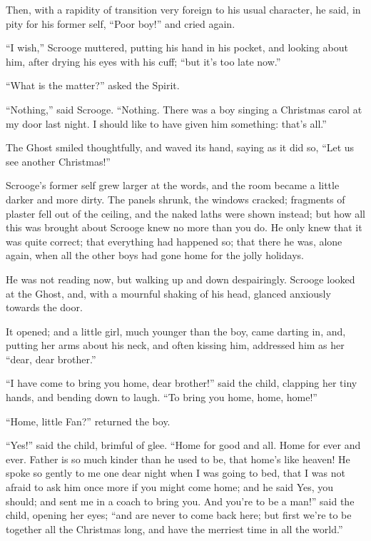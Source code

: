 \documentclass[paper=5.5in:8.5in,BCOR=7mm,twoside,DIV=calc,12pt,usegeometry]{scrbook} %
\begin{document}
Then, with a rapidity of transition very foreign to his usual character, he said, in pity for his former self, \enquote{Poor boy!} and cried again.

\enquote{I wish,} Scrooge muttered, putting his hand in his pocket, and looking about him, after drying his eyes with his cuff; \enquote{but it's too late now.}

\enquote{What is the matter?} asked the Spirit.

\enquote{Nothing,} said Scrooge. \enquote{Nothing. There was a boy singing a Christmas carol at my door last night. I should like to have given him something: that's all.}

The Ghost smiled thoughtfully, and waved its hand, saying as it did so, \enquote{Let us see another Christmas!}

Scrooge's former self grew larger at the words, and the room became a little darker and more dirty. The panels shrunk, the windows cracked; fragments of plaster fell out of the ceiling, and the naked laths were shown instead; but how all this was brought about Scrooge knew no more than you do. He only knew that it was quite correct; that everything had happened so; that there he was, alone again, when all the other boys had gone home for the jolly holidays.

He was not reading now, but walking up and down despairingly. Scrooge looked at the Ghost, and, with a mournful shaking of his head, glanced anxiously towards the door.

It opened; and a little girl, much younger than the boy, came darting in, and, putting her arms about his neck, and often kissing him, addressed him as her \enquote{dear, dear brother.}

\enquote{I have come to bring you home, dear brother!} said the child, clapping her tiny hands, and bending down to laugh. \enquote{To bring you home, home, home!}

\enquote{Home, little Fan?} returned the boy.

\enquote{Yes!} said the child, brimful of glee. \enquote{Home for good and all. Home for ever and ever. Father is so much kinder than he used to be, that home's like heaven! He spoke so gently to me one dear night when I was going to bed, that I was not afraid to ask him once more if you might come home; and he said Yes, you should; and sent me in a coach to bring you. And you're to be a man!} said the child, opening her eyes; \enquote{and are never to come back here; but first we're to be together all the Christmas long, and have the merriest time in all the world.}
\end{document}
